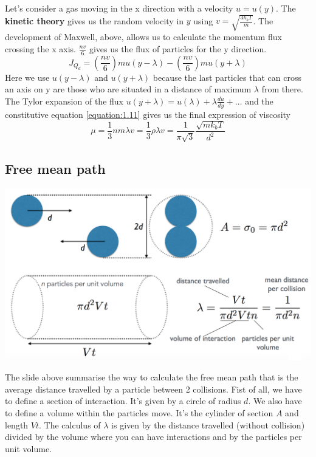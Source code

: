 	Let's consider a gas moving in the x direction with a velocity $u=u(y)$. The \textbf{kinetic theory} gives us the random velocity in $y$ using $v = \sqrt{\frac{3k_bT}{m}}$. The development of Maxwell, above, allows us to calculate the momentum flux crossing the x axis. $\frac{nv}{6}$ gives us the flux of particles for the y direction. 
	\begin{equation}
		J_{Q_d} = \left(\frac{nv}{6}\right)mu(y-\lambda) - \left(\frac{nv}{6}\right)mu(y+\lambda)
	\end{equation}
	Here we use $u(y-\lambda)$ and $u(y+\lambda)$ because the last particles that can cross an axis on y are those who are situated in a distance of maximum $\lambda$ from there. \\
	The Tylor expansion of the flux $u(y + \lambda) = u(\lambda) + \lambda\frac{du}{dy} + \dots$ and the constitutive equation \eqref{equation:1.11} gives us the final expression of viscosity 
	\begin{equation}
	\mu = \frac{1}{3}nm\lambda v = \frac{1}{3}\rho \lambda v = \frac{1}{\pi \sqrt{3}}\frac{\sqrt{mk_bT}}{d^2}
	\end{equation}
	
\subsection{Free mean path}
	\begin{center}
	\includegraphics[scale=0.45]{ch1/9}
	\end{center}
	The slide above summarise the way to calculate the free mean path that is the average distance travelled by a particle between 2 collisions. Fist of all, we have to define a section of interaction. It's given by a circle of radius $d$. We also have to define a volume within the particles move. It's the cylinder of section $A$ and length $Vt$. The calculus of $\lambda$ is given by the distance travelled (without collision) divided by the volume where you can have interactions and by the particles per unit volume. 